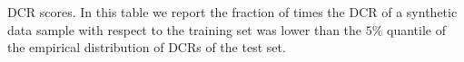 \begin{table}[t!]  
    \centering
    \caption{DCR scores. In this table we report the fraction of times the DCR of a synthetic data sample with respect to the training set was lower than the $5\%$ quantile of the empirical distribution of DCRs of the test set.
    }
    \label{tbl:dcr005}
    \begin{threeparttable}
    {
    \resizebox{\columnwidth}{!}
    {

}
    }
    \end{threeparttable}
\end{table}